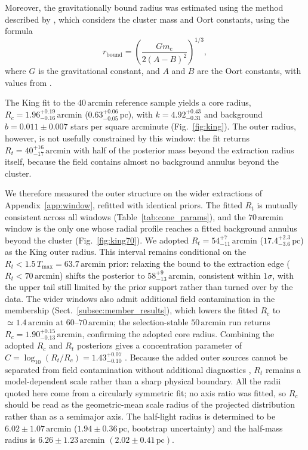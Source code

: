 \documentclass{aa}
\begin{document}
Moreover, the gravitationally bound radius was estimated using the method described by \citet{1998MNRAS.299..955P}, which considers the cluster mass and Oort constants, using the formula
\begin{equation}
	r_\mathrm{bound} = \left( \frac{Gm_{\mathrm{c}}}{2(A-B)^2} \right)^{1/3},
\end{equation}
where $G$ is the gravitational constant, and $A$ and $B$ are the Oort constants, with values from \citet{2017MNRAS.468L..63B}.

The King fit to the $40\,\mathrm{arcmin}$ reference sample yields a core radius, $R_c = 1.96^{+0.19}_{-0.16}\,\mathrm{arcmin}$ ($0.63^{+0.06}_{-0.05}\,\mathrm{pc}$), with $k = 4.92^{+0.43}_{-0.31}$ and background $b = 0.011\pm0.007$ stars per square arcminute (Fig.~\ref{fig:king}). The outer radius, however, is not usefully constrained by this window: the fit returns $R_t = 40^{+16}_{-17}\,\mathrm{arcmin}$ with half of the posterior mass beyond the extraction radius itself, because the field contains almost no background annulus beyond the cluster.

We therefore measured the outer structure on the wider extractions of Appendix~\ref{app:window}, refitted with identical priors. The fitted $R_t$ is mutually consistent across all windows (Table~\ref{tab:cone_params}), and the $70\,\mathrm{arcmin}$ window is the only one whose radial profile reaches a fitted background annulus beyond the cluster (Fig.~\ref{fig:king70}). We adopted $R_t = 54^{+7}_{-11}\,\mathrm{arcmin}$ ($17.4^{+2.3}_{-3.6}\,\mathrm{pc}$) as the King outer radius. This interval remains conditional on the $R_t<1.5\,T_{\mathrm{max}}=63.7\,\mathrm{arcmin}$ prior: relaxing the bound to the extraction edge ($R_t<70\,\mathrm{arcmin}$) shifts the posterior to $58^{+9}_{-13}\,\mathrm{arcmin}$, consistent within $1\sigma$, with the upper tail still limited by the prior support rather than turned over by the data. The wider windows also admit additional field contamination in the membership (Sect.~\ref{subsec:member_results}), which lowers the fitted $R_c$ to $\simeq1.4\,\mathrm{arcmin}$ at $60$--$70\,\mathrm{arcmin}$; the selection-stable $50\,\mathrm{arcmin}$ run returns $R_c = 1.90^{+0.15}_{-0.13}\,\mathrm{arcmin}$, confirming the adopted core radius. Combining the adopted $R_c$ and $R_t$ posteriors gives a concentration parameter of $C = \log_{10}(R_t/R_c) = 1.43^{+0.07}_{-0.10}$ \citep{1975AJ.....80..427P}. Because the added outer sources cannot be separated from field contamination without additional diagnostics \citep{2025A&A...694A.258R,2025A&A...698A.156X}, $R_t$ remains a model-dependent scale rather than a sharp physical boundary. All the radii quoted here come from a circularly symmetric fit; no axis ratio was fitted, so $R_c$ should be read as the geometric-mean scale radius of the projected distribution rather than as a semimajor axis. The half-light radius is determined to be $6.02 \pm 1.07\,\mathrm{arcmin}$ ($1.94 \pm 0.36\,\mathrm{pc}$, bootstrap uncertainty) and the half-mass radius is $6.26 \pm 1.23\,\mathrm{arcmin}$ $(2.02 \pm 0.41\,\mathrm{pc})$.
\end{document}
